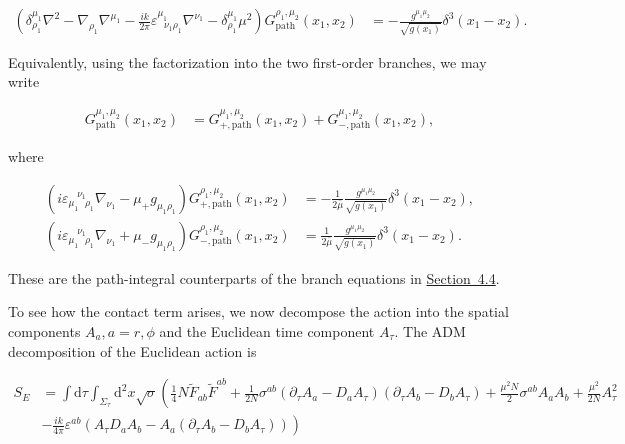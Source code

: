 \begin{align}
\left( \delta _{\rho _{1}}^{\mu _{1}}\nabla ^{2}-\nabla _{\rho _{1}}\nabla ^{\mu _{1}}-\frac{ik}{2\pi}\varepsilon ^{\mu _{1}}_{~~~\nu _{1}\rho _{1}}\nabla ^{\nu _{1}}-\delta _{\rho _{1}}^{\mu _{1}}\mu ^{2} \right)G_{\mathrm{path}}^{\rho _{1},\mu _{2}}(x_{1},x_{2}) & =-\frac{g^{\mu _{1}\mu _{2}}}{\sqrt{ g(x_{1}) }}\delta ^{3}(x_{1}-x_{2}).
\end{align}

Equivalently, using the factorization into the two first-order branches, we may write

\begin{align}
G_{\mathrm{path}}^{\mu _{1},\mu _{2}}(x_{1},x_{2}) & =G_{+,\mathrm{path}}^{\mu _{1},\mu _{2}}(x_{1},x_{2})+G_{-,\mathrm{path}}^{\mu _{1},\mu _{2}}(x_{1},x_{2}),
\end{align}

where

\begin{align}
(i\varepsilon _{\mu _{1}~~~\rho _{1}}^{~~~~\nu _{1}}\nabla _{\nu _{1}}-\mu _{+}g_{\mu _{1}\rho _{1}})G_{+,\mathrm{path}}^{\rho _{1},\mu _{2}}(x_{1},x_{2}) & =-\frac{1}{2\bar{\mu}}\frac{g^{\mu _{1}\mu _{2}}}{\sqrt{ g(x_{1}) }}\delta ^{3}(x_{1}-x_{2}), \\
(i\varepsilon _{\mu _{1}~~~\rho _{1}}^{~~~~\nu _{1}}\nabla _{\nu _{1}}+\mu _{-}g_{\mu _{1}\rho _{1}})G_{-,\mathrm{path}}^{\rho _{1},\mu _{2}}(x_{1},x_{2}) & =\frac{1}{2\bar{\mu}}\frac{g^{\mu _{1}\mu _{2}}}{\sqrt{ g(x_{1}) }}\delta ^{3}(x_{1}-x_{2}).
\end{align}

These are the path-integral counterparts of the branch equations in \hyperref[subsec:covariant-green-function-check]{Section~4.4}.

To see how the contact term arises, we now decompose the action into the spatial components $A_{a},a=r,\phi$ and the Euclidean time component $A_{\tau}$. The ADM decomposition of the Euclidean action is

\begin{align}
S_{E} & =\int \mathrm{d}\tau \int _{\Sigma _{\tau}} \mathrm{d}^{2}x\sqrt{ \sigma }\left(\frac{1}{4}N\tilde{F}_{ab}\tilde{F}^{ab}+\frac{1}{2N}\sigma ^{ab}(\partial _{\tau}A_{a}-D_{a}A_{\tau})(\partial _{\tau}A_{b}-D_{b}A_{\tau})+\frac{\mu ^{2}N}{2}\sigma ^{ab}A_{a}A_{b}+\frac{\mu ^{2}}{2N}A_{\tau}^{2}\right. \\
 & \left.-\frac{ik}{4\pi}\varepsilon ^{ab}(A_{\tau}D_{a}A_{b}-A_{a}(\partial _{\tau}A_{b}-D_{b}A_{\tau}))\right)
\end{align}

